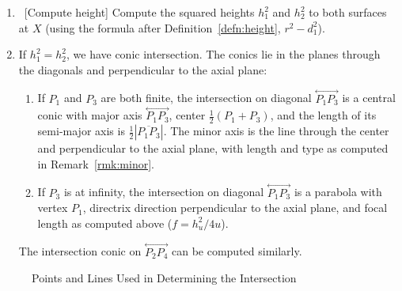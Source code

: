 \begin{center}
\begin{minipage}{5in}
{\begin{enumerate}
       (but $X$ not on any skeletal line).
          If the diagonals are parallel, then ${\cal Q}_1$ and ${\cal Q}_2$
          do not have conic intersection.\footnote{We can show that if
          the quadrics have conic intersection,
          the diagonals will not be parallel.
       In particular, if the axes intersect,
          the diagonals are not parallel by Shene \cite[Lemma~4.5]{shene:1992}.
          If the axes are parallel but distinct,
          the cone angles are equal
          (Theorem~\ref{theorem:parallel-axes} below) which
          implies one of the diagonals is the line at infinity.
          Finally, step 2 deals with identical axes.}
     \item \ [Compute height]
          Compute the squared heights $h_{1}^2$ and $h_{2}^2$ to both
          surfaces at $X$ (using the formula after
          Definition~\ref{defn:height}, $r^2 - d_1^2$).
     \item If $h_{1}^2=h_{2}^2$, we have conic intersection.
          The conics lie in the planes through the diagonals and perpendicular
          to the axial plane:
\begin{enumerate}
     \item If $P_1$ and $P_3$ are both finite, the intersection on
          diagonal $\stackrel{\longleftrightarrow}{P_1P_3}$ is a central conic
       with major axis $\stackrel{\longleftrightarrow}{P_1P_3}$,
       center $\frac{1}{2}(P_1 + P_3)$, and the length of its semi-major
       axis is $\frac{1}{2}|\overline{P_1 P_3}|$.
       The minor axis is the line through the center and perpendicular to
          the axial plane, with length and type
       as computed in Remark~\ref{rmk:minor}.

     \item If $P_3$ is at infinity, the intersection on  diagonal
          $\stackrel{\longleftrightarrow}{P_1P_3}$ is a parabola
          with vertex $P_1$, directrix direction perpendicular to the axial
          plane, and focal length as computed above ($f=h_u^2/4u$).
\end{enumerate}
          The intersection conic on $\stackrel{\longleftrightarrow}{P_2P_4}$
          can be computed similarly.
\end{enumerate}
}
\end{minipage}
\end{center}

\begin{figure}
\vspace{5.5cm}
\caption{Points and Lines Used in Determining the Intersection}
\label{fig:point-and-line}
\end{figure}



